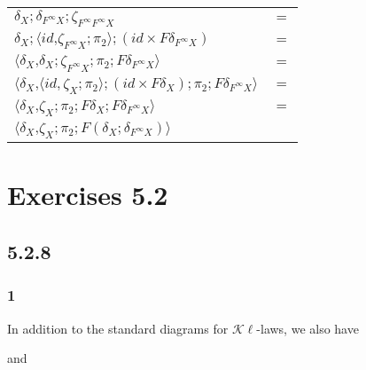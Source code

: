 \documentclass{article}
\begin{document}
\begin{description}
\begin{tabular}{ll}
$\delta_X;\delta_{F^\infty X};\zeta_{F^\infty F^\infty X}$ & $=$ \\
$\delta_X;\langle id \text{,} \zeta_{F^\infty X};\pi_2 \rangle;(id \times F \delta_{F^\infty X})$ & $=$ \\
$\langle \delta_X \text{,} \delta_X;\zeta_{F^\infty X};\pi_2;F \delta_{F^\infty X} \rangle$ & $=$ \\
$\langle \delta_X \text{,} \langle id, \zeta_X;\pi_2 \rangle;(id \times F \delta_X);\pi_2;F \delta_{F^\infty X}\rangle$ & $=$ \\
$\langle \delta_X \text{,} \zeta_X;\pi_2;F \delta_X;F \delta_{F^\infty X} \rangle$ & $=$ \\
$\langle \delta_X \text{,} \zeta_X;\pi_2;F(\delta_X;\delta_{F^\infty X}) \rangle$ 
\end{tabular}

\end{description}

\section*{Exercises 5.2}

\subsection*{5.2.8}

\subsubsection*{1}

In addition to the standard diagrams for $\mathcal K \ell$-laws, we also have

\begin{center}
\end{center}

and

\begin{center}
\end{center}
\end{document}
